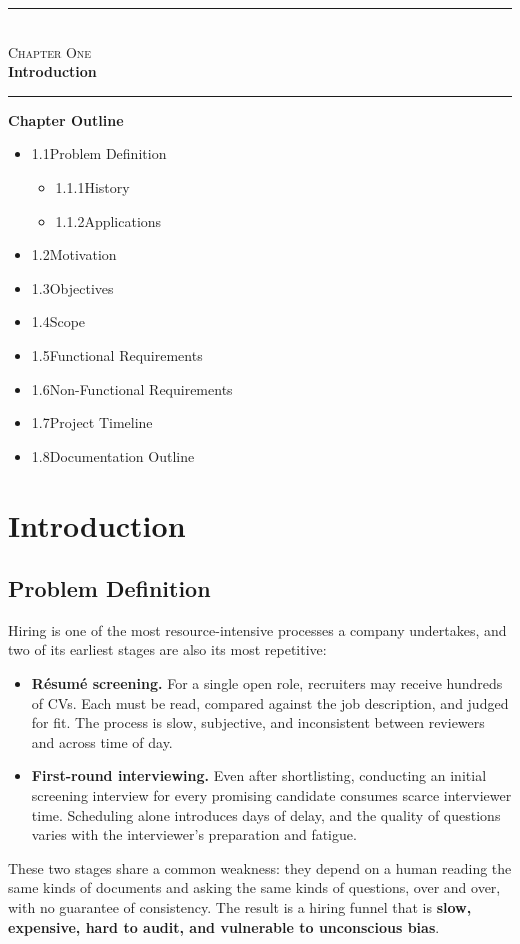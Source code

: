 \documentclass[12pt,a4paper,oneside]{report}
\newcommand{\chapterfrontpage}[3]{%
  \clearpage
  \thispagestyle{empty}
  \vspace*{4cm}
  \begin{center}
    \textcolor{ainshams}{\rule{0.6\linewidth}{1.5pt}}\\[0.6cm]
    {\LARGE\textsc{#1}}\\[0.8cm]
    {\Huge\bfseries #2}\\[0.6cm]
    \textcolor{ainshams}{\rule{0.6\linewidth}{1.5pt}}
  \end{center}
  \vspace{1.8cm}
  \begin{center}
    \begin{minipage}{0.72\linewidth}
      \textbf{\large Chapter Outline}\\[6pt]
      \begin{itemize}[leftmargin=1.4em]
        #3
      \end{itemize}
    \end{minipage}
  \end{center}
  \clearpage
}
\begin{document}
\chapterfrontpage{Chapter One}{Introduction}{%
  \item 1.1\quad Problem Definition
    \begin{itemize}
      \item 1.1.1\quad History
      \item 1.1.2\quad Applications
    \end{itemize}
  \item 1.2\quad Motivation
  \item 1.3\quad Objectives
  \item 1.4\quad Scope
  \item 1.5\quad Functional Requirements
  \item 1.6\quad Non-Functional Requirements
  \item 1.7\quad Project Timeline
  \item 1.8\quad Documentation Outline
}

\chapter{Introduction}
\label{ch:introduction}

\section{Problem Definition}

Hiring is one of the most resource-intensive processes a company undertakes, and two of its
earliest stages are also its most repetitive:

\begin{itemize}
  \item \textbf{Résumé screening.} For a single open role, recruiters may receive hundreds of
    CVs. Each must be read, compared against the job description, and judged for fit. The
    process is slow, subjective, and inconsistent between reviewers and across time of day.
  \item \textbf{First-round interviewing.} Even after shortlisting, conducting an initial
    screening interview for every promising candidate consumes scarce interviewer time.
    Scheduling alone introduces days of delay, and the quality of questions varies with the
    interviewer's preparation and fatigue.
\end{itemize}

These two stages share a common weakness: they depend on a human reading the same kinds of
documents and asking the same kinds of questions, over and over, with no guarantee of
consistency. The result is a hiring funnel that is \textbf{slow, expensive, hard to audit, and
vulnerable to unconscious bias}.
\end{document}
